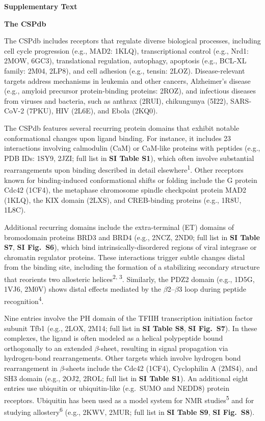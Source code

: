 \documentclass[11pt]{article}
\begin{document}
\begin{center}
{\LARGE\bfseries Supplementary Text}
\end{center}

\vspace{0.4em}
\noindent\textbf{The CSPdb}

The CSPdb includes receptors that regulate diverse biological processes, including
cell cycle progression (e.g., MAD2: 1KLQ), transcriptional control (e.g., Nrd1:
2MOW, 6GC3), translational regulation, autophagy, apoptosis (e.g., BCL-XL family:
2M04, 2LP8), and cell adhesion (e.g., tensin: 2LOZ).
Disease-relevant targets address mechanisms in leukemia and other cancers,
Alzheimer's disease (e.g., amyloid precursor protein-binding
proteins: 2ROZ), and infectious diseases from viruses and bacteria, such as
anthrax (2RUI), chikungunya (5I22), SARS-CoV-2 (7PKU), HIV (2L6E), and Ebola
(2KQ0).

The CSPdb features several recurring protein domains that exhibit notable
conformational changes upon ligand binding. For instance, it includes 23
interactions involving calmodulin (CaM) or CaM-like proteins with peptides
(e.g., PDB IDs: 1SY9, 2JZI; full list in \textbf{SI Table S1}), which often involve
substantial rearrangements upon binding described in detail
elsewhere\textsuperscript{1}. Other receptors known for binding-induced
conformational shifts or folding include the G protein Cdc42 (1CF4), the
metaphase chromosome spindle checkpoint protein MAD2 (1KLQ), the KIX domain
(2LXS), and CREB-binding proteins (e.g., 1R8U, 1L8C).

Additional recurring domains include the extra-terminal (ET) domains of
bromodomain proteins BRD3 and BRD4 (e.g., 2NCZ, 2ND0; full list in \textbf{SI Table S7},
\textbf{SI Fig.\ S6}), which bind intrinsically-disordered regions of viral integrase or
chromatin regulator proteins. These interactions trigger subtle
changes distal from the binding site, including the formation of a stabilizing
secondary structure that reorients two allosteric helices\textsuperscript{2, 3}.
Similarly, the PDZ2 domain (e.g., 1D5G, 1VJ6, 2M0V) shows distal effects
mediated by the $\beta$2--$\beta$3 loop during peptide
recognition\textsuperscript{4}.

Nine entries involve the PH domain of the TFIIH transcription initiation factor
subunit Tfb1 (e.g., 2LOX, 2M14; full list in \textbf{SI Table S8}, \textbf{SI Fig.\ S7}). In these
complexes, the ligand is often modeled as a helical polypeptide bound
orthogonally to an extended $\beta$-sheet, resulting in signal
propagation via hydrogen-bond rearrangements. Other targets which involve
hydrogen bond rearrangement in $\beta$-sheets include the Cdc42 (1CF4),
Cyclophilin A (2MS4), and SH3 domain (e.g., 2OJ2, 2ROL; full list in \textbf{SI Table S1}). An additional eight entries use ubiquitin or ubiquitin-like (e.g.\ SUMO
and NEDD8) protein receptors. Ubiquitin has been used as a model system for NMR
studies\textsuperscript{5} and for studying allostery\textsuperscript{6}
(e.g., 2KWV, 2MUR; full list in \textbf{SI Table S9}, \textbf{SI Fig.\ S8}).
\end{document}
